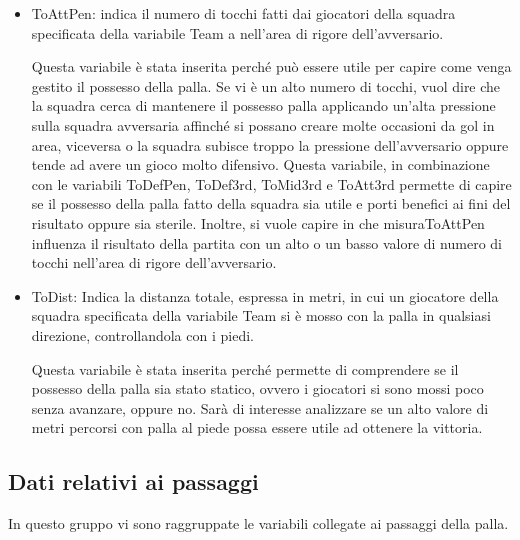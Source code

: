 \begin{itemize}
	\item \textsf{ToAttPen}: indica il numero di tocchi fatti dai giocatori della squadra specificata della variabile \textsf{Team} a nell'area di rigore dell'avversario. 
	
	Questa variabile è stata inserita perché può essere utile per capire come venga gestito il possesso della palla. Se vi è un alto numero di tocchi, vuol dire che la squadra cerca di mantenere il possesso palla applicando un'alta pressione sulla squadra avversaria affinché si possano creare molte occasioni da gol in area, viceversa o la squadra subisce troppo la pressione dell'avversario oppure tende ad avere un gioco molto difensivo. Questa variabile, in combinazione con le variabili \textsf{ToDefPen}, \textsf{ToDef3rd}, \textsf{ToMid3rd} e \textsf{ToAtt3rd} permette di capire se il possesso della palla fatto della squadra sia utile e porti benefici ai fini del risultato oppure sia sterile. Inoltre, si vuole capire in che misura\textsf{ToAttPen} influenza il risultato della partita con un alto o un basso valore di numero di tocchi nell'area di rigore dell'avversario.
	
	\item \textsf{ToDist}: Indica la distanza totale, espressa in metri, in cui un giocatore della squadra specificata della variabile \textsf{Team} si è mosso con la palla in qualsiasi direzione, controllandola con i piedi.
	
	Questa variabile è stata inserita perché permette di comprendere se il possesso della palla sia stato statico, ovvero i giocatori si sono mossi poco senza avanzare, oppure no. Sarà di interesse analizzare se un alto valore di metri percorsi con palla al piede possa essere utile ad ottenere la vittoria.

\end{itemize}

\subsection{Dati relativi ai passaggi}

In questo gruppo vi sono raggruppate le variabili collegate ai passaggi della palla.

